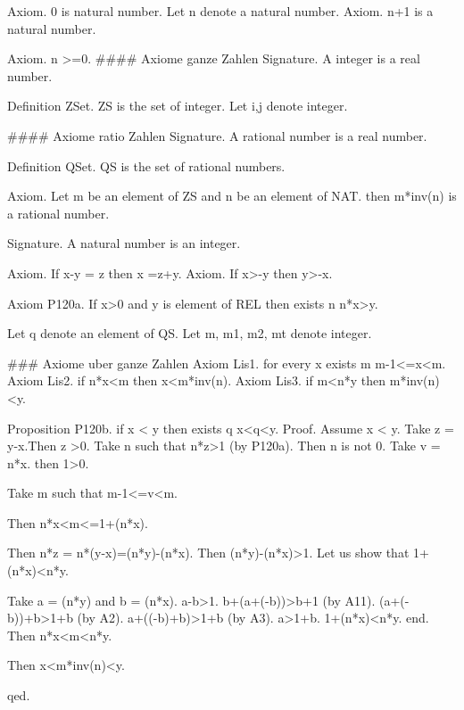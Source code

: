 \documentclass{article}
\newenvironment{forthel}{\begin{leftbar}}{\end{leftbar}}
\begin{document}
\begin{forthel}
Axiom. 0 is natural number.
Let n denote a natural number.
Axiom. n+1 is a natural number.

Axiom. n >=0.
#### Axiome ganze Zahlen
Signature. A integer is a real number.

Definition ZSet.
ZS is the set of integer.
Let i,j denote integer.

#### Axiome ratio Zahlen
Signature. A rational number is a real number.

Definition QSet.
QS is the set of rational numbers.

Axiom. Let m be an element of ZS and n be an element of NAT. then m*inv(n) is a rational number.

Signature. A natural number is an integer.


Axiom. If x-y = z then x =z+y. 
Axiom. If x>-y then y>-x. 


Axiom P120a. If x>0 and y is element of REL then exists n  n*x>y.


Let q denote an element of QS.
Let m, m1, m2, mt denote integer.

### Axiome uber ganze Zahlen
Axiom Lis1. for every x exists m m-1<=x<m.
Axiom Lis2. if n*x<m then x<m*inv(n).
Axiom Lis3. if m<n*y then m*inv(n)<y.



Proposition P120b. if x < y then exists q   x<q<y.
Proof.
Assume x < y.
Take z = y-x.Then z >0.
Take n  such that n*z>1 (by P120a).
Then n is not 0.
Take v = n*x. then 1>0.

Take m such that m-1<=v<m.

Then n*x<m<=1+(n*x).

Then n*z = n*(y-x)=(n*y)-(n*x).
Then (n*y)-(n*x)>1.
Let us show that 1+(n*x)<n*y.

Take a = (n*y) and b = (n*x).
a-b>1.
b+(a+(-b))>b+1 (by A11).
(a+(-b))+b>1+b (by A2).
a+((-b)+b)>1+b (by A3).
a>1+b.
1+(n*x)<n*y.
end.
Then n*x<m<n*y.

Then x<m*inv(n)<y.

qed.











\end{forthel}
\end{document}
